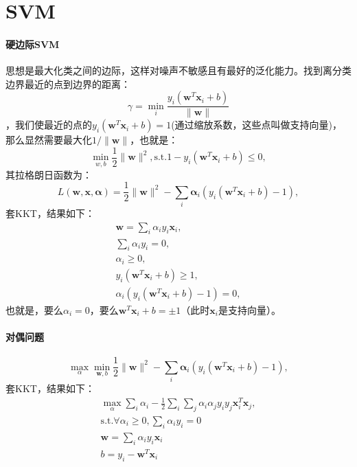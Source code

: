 \section{SVM}
\paragraph{硬边际SVM} 思想是最大化类之间的边际，这样对噪声不敏感且有最好的泛化能力。找到离分类边界最近的点到边界的距离：
$$\gamma = \min_i \frac{y_i(\bm w^T\bm x_i + b)}{\|\bm w\|}$$，我们使最近的点的$y_i(\bm w^T\bm x_i + b) = 1$(通过缩放系数，这些点叫做支持向量)，那么显然需要最大化$1/\|\bm w\|$，也就是：
$$\min_{w,b} \frac{1}{2}\|\bm w\|^2, \text{s.t.} 1 - y_i(\bm w^T\bm x_i + b) \le 0,$$
其拉格朗日函数为：
$$L(\bm w, \bm x, \bm \alpha) = \frac{1}{2}\|\bm w\|^2 - \sum_i \bm \alpha_i(y_i(\bm w^T\bm x_i + b) - 1),$$套KKT，结果如下：
$$\begin{array}{l}
\bm w = \sum_i \alpha_iy_i\bm x_i, \\
\sum_i \alpha_iy_i = 0, \\
\alpha_i \ge 0, \\
y_i(\bm w^T\bm x_i + b) \ge 1, \\
\alpha_i(y_i(\bm w^T\bm x_i + b) - 1) = 0,
\end{array}$$
也就是，要么$\alpha_i = 0$，要么$\bm w^T\bm x_i + b = \pm 1$（此时$\bm x_i$是支持向量）。
\paragraph{对偶问题}
$$\max_\alpha\min_{\bm w, b} \frac{1}{2}\|\bm w\|^2 - \sum_i \bm \alpha_i(y_i(\bm w^T\bm x_i + b) - 1),$$
套KKT，结果如下：
$$
\begin{array}{l}
\max_\alpha \sum_i \alpha_i - \frac{1}{2}\sum_i\sum_j \alpha_i\alpha_jy_iy_j\bm{x}_i^T\bm{x}_j, \\
\text{s.t.} \forall \alpha_i \ge 0, \sum_i \alpha_iy_i = 0 \\
\bm w = \sum_i \alpha_iy_i\bm x_i \\
b = y_i - \bm w^T \bm x_i
\end{array}
$$

